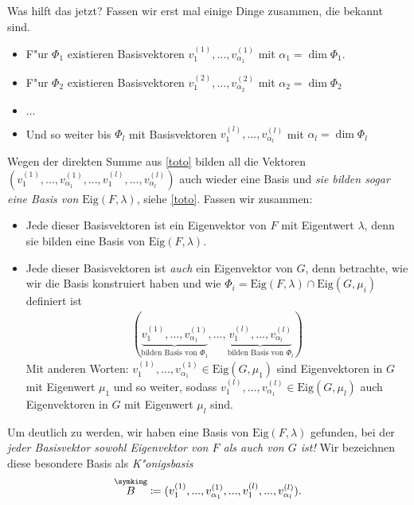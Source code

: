 \documentclass[a4paper,fontsize=12pt]{article}
\newcommand{\crown}[1]{\overset{\symking}{#1}}
\theoremstyle{plain}
\begin{document}
Was hilft das jetzt? Fassen wir erst mal einige Dinge zusammen, die bekannt sind. 
\begin{itemize}
    \item F"ur $ \Phi_1 $ existieren Basisvektoren $v^{(1)}_1,...,v^{(1)}_{\alpha_1}$ mit $\alpha_1 = \dim \Phi_1$.
    
    \item F"ur $ \Phi_2 $ existieren Basisvektoren $v^{(2)}_{1},...,v^{(2)}_{\alpha_2}$ mit $\alpha_2 = \dim \Phi_2$
    
    \item $...$
    
    
    \item Und so weiter bis $ \Phi_l $ mit Basisvektoren $v^{(l)}_{1},...,v^{(l)}_{\alpha_l}$ mit $\alpha_l = \dim \Phi_l$
\end{itemize}
Wegen der direkten Summe aus \eqref{toto} bilden all die Vektoren $(v^{(1)}_1,...,v^{(1)}_{\alpha_1}, ... , v^{(l)}_{1},...,v^{(l)}_{\alpha_l})$ auch wieder eine Basis und \emph{sie bilden sogar eine Basis von $\mathrm{Eig}(F,\lambda)$}, siehe \eqref{toto}. Fassen wir zusammen:
\begin{itemize}
    \item Jede dieser Basisvektoren ist ein Eigenvektor von $F$ mit Eigentwert $\lambda$, denn sie bilden eine Basis von $\mathrm{Eig}(F,\lambda)$.
    
    \item Jede dieser Basisvektoren ist \emph{auch} ein Eigenvektor von $G$, denn betrachte, wie wir die Basis konstruiert haben und wie $\Phi_i = \mathrm{Eig}(F,\lambda) \cap \mathrm{Eig}(G,\mu_i)$ definiert ist
    \begin{align*}
        (\underbrace{v^{(1)}_1,...,v^{(1)}_{\alpha_1}}_{\text{bilden Basis von $\Phi_1$}}, ... , \underbrace{v^{(l)}_{1},...,v^{(l)}_{\alpha_l}}_{\text{bilden Basis von $\Phi_l$}})
    \end{align*}
    Mit anderen Worten: $v^{(1)}_1,...,v^{(1)}_{\alpha_1} \in \mathrm{Eig}(G,\mu_1)$ sind Eigenvektoren in $G$ mit Eigenwert $\mu_1$ und so weiter, sodass $v^{(l)}_1,...,v^{(l)}_{\alpha_1} \in \mathrm{Eig}(G,\mu_l)$ auch Eigenvektoren in $G$ mit Eigenwert $\mu_l$ sind.
\end{itemize}
Um deutlich zu werden, wir haben eine Basis von $\mathrm{Eig}(F,\lambda)$ gefunden, bei der \emph{jeder Basisvektor sowohl Eigenvektor von $F$ als auch von $G$ ist!} Wir bezeichnen diese besondere Basis als \textit{K"onigsbasis}
\[
    \crown B \coloneqq (v^{(1)}_1,...,v^{(1)}_{\alpha_1}, ... ,v^{(l)}_{1},...,v^{(l)}_{\alpha_l}).
\]
\end{document}
